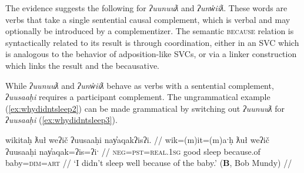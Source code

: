 The evidence suggests the following for \textit{ʔuunuuƛ} and \textit{ʔunw̓iiƛ}. These words are verbs that take a single sentential causal complement, which is verbal and may optionally be introduced by a complementizer. The semantic \textsc{because} relation is syntactically related to its result is through coordination, either in an SVC which is analogous to the behavior of adposition-like SVCs, or via a linker construction which links the result and the becausative.


While \textit{ʔuunuuƛ} and \textit{ʔunw̓iiƛ} behave as verbs with a sentential complement, \textit{ʔuusaaḥi} requires a participant complement. The ungrammatical example (\ref{ex:whydidntsleep2}) can be made grammatical by switching out \textit{ʔuunuuƛ} for \textit{ʔuusaaḥi} (\ref{ex:whydidntsleep3}).

\ex \label{ex:whydidntsleep3}
\begingl
\glpreamble wikitaḥ ƛuł weʔič ʔuusaaḥi nay̓aqakʔisʔi. //
\gla wik=(m)it=(m)aˑḥ ƛuł weʔič ʔuusaaḥi nay̓aqak=ʔis=ʔiˑ //
\glb \textsc{neg}=\textsc{pst}=\textsc{real.1sg} good sleep because.of baby=\textsc{dim}=\textsc{art} //
\glft `I didn't sleep well because of the baby.' (\textbf{B}, Bob Mundy) //
\endgl
\xe

\begin{comment}
\ex \label{ex:uusahi1}
\begingl
\glpreamble ʔuusaaḥimta nay̓aqakʔi. wikitaḥ ƛuł weʔič. //
\gla ʔuusaaḥi=imt=(m)aˑ nay̓aqak=ʔiˑ. wik=(m)it=(m)aˑḥ ƛuł weʔič //
\glb because.of=\textsc{pst}=\textsc{real.3} baby=\textsc{art} \textsc{neg}=\textsc{pst}=\textsc{real.1sg} good sleep //
\glft `It was because of the baby; I didn't sleep well.' (\textbf{B}, Bob Mundy) //
\endgl
\xe

\ex~ \label{ex:uusahi2}
\begingl
\glpreamble *ʔuusaaḥimta ʕiḥak nay̓aqakʔi. wikitaḥ ƛuł weʔič. //
\gla ʔuusaaḥi=imt=(m)aˑ ʕiḥak nay̓aqak=ʔiˑ. wik=(m)it=(m)aˑḥ ƛuł weʔič //
\glb because.of=\textsc{pst}=\textsc{real.3} cry.\textsc{dr} baby \textsc{neg}=\textsc{pst}=\textsc{real.1sg} good sleep //
\glft Intended: `It was because of the crying baby; I didn't sleep well.' (\textbf{B}, Bob Mundy) //
\endgl
\xe
\end{comment}


